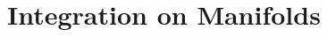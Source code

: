 \documentclass[12pt,class=article,crop=false]{standalone}
\begin{document}
\section{Integration on Manifolds}
\end{document}
